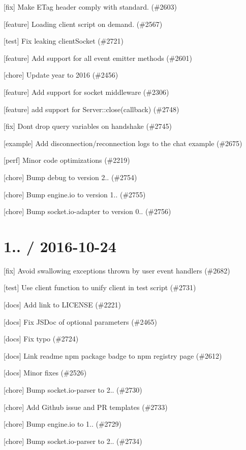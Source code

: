 \begin{DoxyItemize}
\item \mbox{[}fix\mbox{]} Make E\+Tag header comply with standard. (\#2603)
\item \mbox{[}feature\mbox{]} Loading client script on demand. (\#2567)
\item \mbox{[}test\mbox{]} Fix leaking client\+Socket (\#2721)
\item \mbox{[}feature\mbox{]} Add support for all event emitter methods (\#2601)
\item \mbox{[}chore\mbox{]} Update year to 2016 (\#2456)
\item \mbox{[}feature\mbox{]} Add support for socket middleware (\#2306)
\item \mbox{[}feature\mbox{]} add support for Server\+::close(callback) (\#2748)
\item \mbox{[}fix\mbox{]} Don\textquotesingle{}t drop query variables on handshake (\#2745)
\item \mbox{[}example\mbox{]} Add disconnection/reconnection logs to the chat example (\#2675)
\item \mbox{[}perf\mbox{]} Minor code optimizations (\#2219)
\item \mbox{[}chore\mbox{]} Bump debug to version 2.. (\#2754)
\item \mbox{[}chore\mbox{]} Bump engine.\+io to version 1.. (\#2755)
\item \mbox{[}chore\mbox{]} Bump socket.\+io-\/adapter to version 0.. (\#2756)
\end{DoxyItemize}

\section*{1.. / 2016-\/10-\/24 }


\begin{DoxyItemize}
\item \mbox{[}fix\mbox{]} Avoid swallowing exceptions thrown by user event handlers (\#2682)
\item \mbox{[}test\mbox{]} Use client function to unify {\ttfamily client} in test script (\#2731)
\item \mbox{[}docs\mbox{]} Add link to L\+I\+C\+E\+N\+SE (\#2221)
\item \mbox{[}docs\mbox{]} Fix J\+S\+Doc of optional parameters (\#2465)
\item \mbox{[}docs\mbox{]} Fix typo (\#2724)
\item \mbox{[}docs\mbox{]} Link readme npm package badge to npm registry page (\#2612)
\item \mbox{[}docs\mbox{]} Minor fixes (\#2526)
\item \mbox{[}chore\mbox{]} Bump socket.\+io-\/parser to 2.. (\#2730)
\item \mbox{[}chore\mbox{]} Add Github issue and PR templates (\#2733)
\item \mbox{[}chore\mbox{]} Bump engine.\+io to 1.. (\#2729)
\item \mbox{[}chore\mbox{]} Bump socket.\+io-\/parser to 2.. (\#2734)
\end{DoxyItemize}

